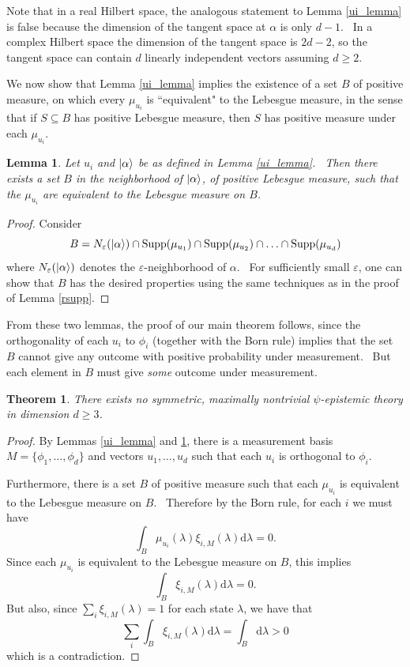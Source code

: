 \documentclass[letterpaper,12pt]{article}
\newtheorem{lem}{Lemma}
\newtheorem{thm}{Theorem}
\newcommand{\ket}[1]{\mbox{$ | #1 \rangle $}}
\DeclareMathOperator{\supp}{Supp}
\begin{document}
Note that in a real Hilbert space, the analogous statement to Lemma \ref{ui_lemma} is false because the dimension of the tangent space at $\alpha$ is only $d-1$. \ In a complex Hilbert space the dimension of the tangent space is $2d-2$, so the tangent space can contain $d$ linearly independent vectors assuming $d\geq 2$.

We now show that Lemma \ref{ui_lemma} implies the existence of a set $B$ of positive measure, on which every $\mu_{u_i}$ is ``equivalent" to the Lebesgue measure, in the sense that if $S\subseteq B$ has positive Lebesgue measure, then $S$ has positive measure under each $\mu_{u_i}$.

\begin{lem}
\label{lem_product_measure}
Let $u_i$ and $\ket{\alpha}$ be as defined in Lemma \ref{ui_lemma}. \ Then there exists a set $B$ in the neighborhood of $\ket{\alpha}$, of positive Lebesgue measure, such that the $\mu_{u_i}$ are equivalent to the Lebesgue measure on $B$.
\end{lem}
\begin{proof}
Consider
\[
B= N_{\varepsilon}(\ket{\alpha}) \cap  \supp(\mu_{u_1}) \cap \supp(\mu_{u_2}) \cap \ldots \cap \supp(\mu_{u_d})
\]
where $N_{\varepsilon}(\ket{\alpha})$ denotes the $\varepsilon$-neighborhood of $\alpha$. \ For sufficiently small $\varepsilon$, one can show that $B$ has the desired properties using the same techniques as in the proof of Lemma \ref{rsupp}.
\end{proof}


From these two lemmas, the proof of our main theorem follows, since the orthogonality of each $u_i$ to $\phi_i$ (together with the Born rule) implies that the set $B$ cannot give any outcome with positive probability under measurement. \ But each element in $B$ must give \textit{some} outcome under measurement.

\begin{thm}
\label{main_thm}
There exists no symmetric, maximally nontrivial $\psi$-epistemic theory in
dimension $d\geq 3$.
\end{thm}
\begin{proof}
By Lemmas \ref{ui_lemma} and \ref{lem_product_measure}, there is a measurement basis $M=\{\phi_1,\ldots,\phi_d\}$ and vectors $u_1, \ldots, u_d$ such that each $u_i$ is orthogonal to $\phi_i$.

Furthermore, there is a set $B$ of positive measure such that each $\mu_{u_i}$ is equivalent to the Lebesgue measure on $B$. \ Therefore by the Born rule, for each $i$ we must have
\[
\int_B \mu_{u_i}(\lambda)\xi_{i,M}(\lambda) \mathrm{d}\lambda =0.
\]
Since each $\mu_{u_i}$ is equivalent to the Lebesgue measure on $B$, this implies
\[
\int_B \xi_{i,M}(\lambda) \mathrm{d}\lambda =0.
\]
But also, since $\sum_i \xi_{i,M}(\lambda) = 1$ for each state $\lambda$, we have that
\[
\displaystyle\sum_i \int_B \xi_{i,M}(\lambda) \mathrm{d}\lambda =  \int_B \mathrm{d}\lambda>0
\]
which is a contradiction. \qedhere

\end{proof}
\end{document}
